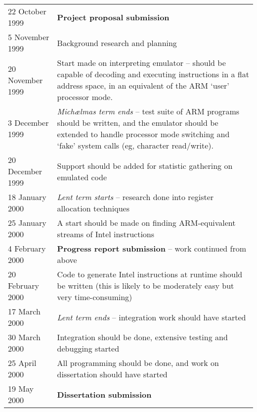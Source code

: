 \begin{longtable}{lX}
22 October 1999 & {\bf Project proposal submission}\\
5 November 1999 & Background research and planning\\
20 November 1999 & Start made on interpreting emulator -- should be capable of decoding and executing instructions in a flat address space, in an equivalent of the ARM `user' processor mode.\\
3 December 1999 & {\em Mich\ae lmas term ends} -- test suite of ARM programs should be written, and the emulator should be extended to handle processor mode switching and `fake' system calls (eg, character read/write).\\
20 December 1999 & Support should be added for statistic gathering on emulated code\\
18 January 2000 & {\em Lent term starts} -- research done into register allocation techniques\\
25 January 2000 & A start should be made on finding ARM-equivalent streams of Intel instructions\\
4 February 2000 & {\bf Progress report submission} -- work continued from above\\
20 February 2000 & Code to generate Intel instructions at runtime should be written (this is likely to be moderately easy but very time-consuming)\\
17 March 2000 & {\em Lent term ends} -- integration work should have started\\
30 March 2000 & Integration should be done, extensive testing and debugging started\\
25 April 2000 & All programming should be done, and work on dissertation should have started\\
19 May 2000 & {\bf Dissertation submission}
\end{longtable}
